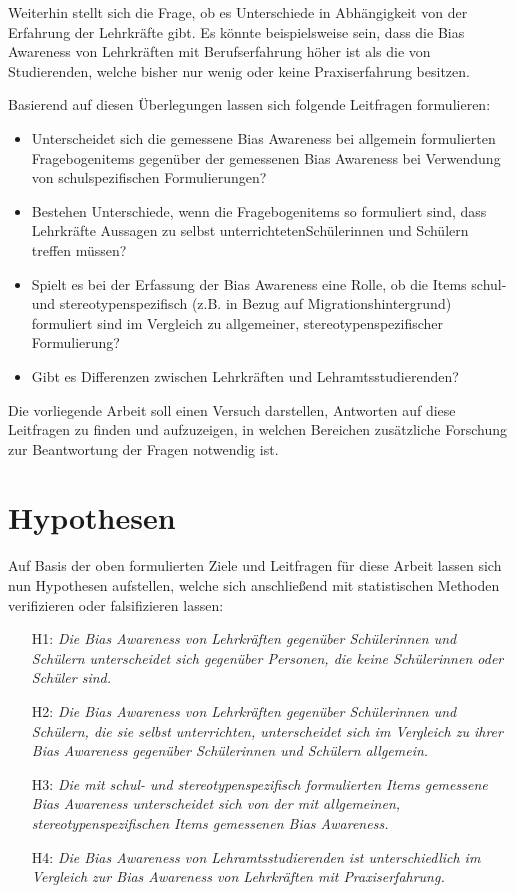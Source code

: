 Weiterhin stellt sich die Frage, ob es Unterschiede in Abhängigkeit von der Erfahrung der Lehrkräfte gibt.
Es könnte beispielsweise sein, dass die Bias Awareness von Lehrkräften mit Berufserfahrung höher ist als die von Studierenden, welche bisher nur wenig oder keine Praxiserfahrung besitzen.

Basierend auf diesen Überlegungen lassen sich folgende Leitfragen formulieren:

\begin{itemize}
	\item Unterscheidet sich die gemessene Bias Awareness bei allgemein formulierten Fragebogenitems gegenüber der gemessenen Bias Awareness bei Verwendung von schulspezifischen Formulierungen?
	\item Bestehen Unterschiede, wenn die Fragebogenitems so formuliert sind, dass Lehrkräfte Aussagen zu selbst unterrichteten\break Schülerinnen und Schülern treffen müssen?
	\item Spielt es bei der Erfassung der Bias Awareness eine Rolle, ob die Items schul- und stereotypenspezifisch (z.B. in Bezug auf Migrationshintergrund) formuliert sind im Vergleich zu allgemeiner, stereotypenspezifischer Formulierung?
	\item Gibt es Differenzen zwischen Lehrkräften und Lehramtsstudierenden?
\end{itemize}

Die vorliegende Arbeit soll einen Versuch darstellen, Antworten auf diese Leitfragen zu finden und aufzuzeigen, in welchen Bereichen zusätzliche Forschung zur Beantwortung der Fragen notwendig ist.


\section{Hypothesen}
\label{sec:hypothesen}

Auf Basis der oben formulierten Ziele und Leitfragen für diese Arbeit lassen sich nun Hypothesen aufstellen, welche sich anschließend mit statistischen Methoden verifizieren oder falsifizieren lassen:

\begin{enumerate}
	\item[H1:] \emph{Die Bias Awareness von Lehrkräften gegenüber Schülerinnen und Schülern unterscheidet sich gegenüber Personen, die keine Schülerinnen oder Schüler sind.}
	\item[H2:] \emph{Die Bias Awareness von Lehrkräften gegenüber Schülerinnen und Schülern, die sie selbst unterrichten, unterscheidet sich im Vergleich zu ihrer Bias Awareness gegenüber Schülerinnen und Schülern allgemein.}
	\item[H3:] \emph{Die mit schul- und stereotypenspezifisch formulierten Items gemessene Bias Awareness unterscheidet sich von der mit allgemeinen, stereotypenspezifischen Items gemessenen Bias Awareness.}
	\item[H4:] \emph{Die Bias Awareness von Lehramtsstudierenden ist unterschiedlich im Vergleich zur Bias Awareness von Lehrkräften mit Praxiserfahrung.}
\end{enumerate}

